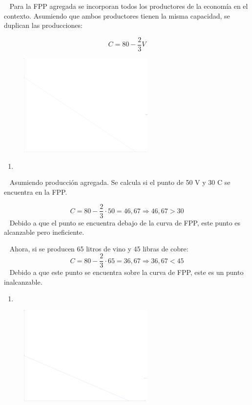 \documentclass[
  letterpaper,
  DIV=11,
  numbers=noendperiod]{scrreport}
\providecommand{\tightlist}{%
  \setlength{\itemsep}{0pt}\setlength{\parskip}{0pt}}\usepackage{longtable,booktabs,array}
\begin{document}
~ Para la FPP agregada se incorporan todos los productores de la
economía en el contexto. Asumiendo que ambos productores tienen la misma
capacidad, se duplican las producciones:

\[C=80-\frac{2}{3}V\]

\begin{figure}

{\centering \includegraphics[width=0.6\textwidth,height=\textheight]{7,8titulo_files/figure-pdf/unnamed-chunk-3-1.pdf}

}

\end{figure}

\begin{enumerate}
\def\labelenumi{\alph{enumi})}
\setcounter{enumi}{1}
\tightlist
\item
\end{enumerate}

~ Asumiendo producción agregada. Se calcula si el punto de 50 V y 30 C
se encuentra en la FPP.

\[C=80-\frac{2}{3}\cdot50 = 46,67 \Rightarrow 46,67 > 30\] ~ Debido a
que el punto se encuentra debajo de la curva de FPP, este punto es
alcanzable pero ineficiente.

~ Ahora, si se producen 65 litros de vino y 45 libras de cobre:
\[C=80-\frac{2}{3}\cdot65 = 36,67 \Rightarrow 36,67 < 45\] ~ Debido a
que este punto se encuentra sobre la curva de FPP, este es un punto
inalcanzable.

\begin{enumerate}
\def\labelenumi{\alph{enumi})}
\setcounter{enumi}{2}
\tightlist
\item
\end{enumerate}

\begin{figure}

{\centering \includegraphics[width=0.6\textwidth,height=\textheight]{7,8titulo_files/figure-pdf/unnamed-chunk-4-1.pdf}

}

\end{figure}
\end{document}
